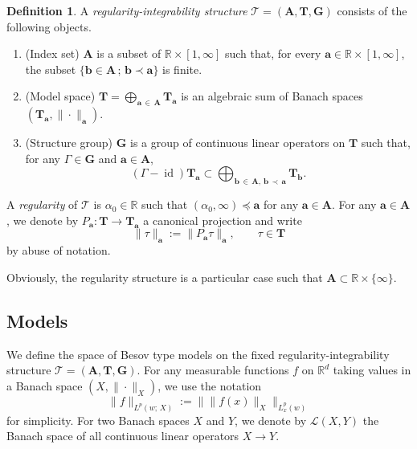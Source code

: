 \documentclass[10pt]{amsart}
\theoremstyle{definition}
\newtheorem{defi}[theo]{Definition}
\numberwithin{equation}{section}
\newcommand{\bbR}{\mathbb{R}}
\newcommand{\bfa}{\mathbf{a}}
\newcommand{\bfb}{\mathbf{b}}
\newcommand{\bfA}{\mathbf{A}}
\newcommand{\bfT}{\mathbf{T}}
\newcommand{\bfG}{\mathbf{G}}
\newcommand{\mcL}{\mathcal{L}}
\newcommand{\scT}{\mathscr{T}}
\DeclareMathOperator{\id}{id}
\begin{document}
\begin{defi}
A \emph{regularity-integrability structure} $\scT=(\bfA,\bfT,\bfG)$ consists of the following objects.
\begin{enumerate}
\item (Index set) $\bfA$ is a subset of $\bbR\times[1,\infty]$ such that, for every $\bfa\in\bbR\times[1,\infty]$, the subset $\{\bfb\in \bfA\, ;\, \bfb\prec\bfa\}$ is finite.
\item (Model space) $\bfT=\bigoplus_{{\bfa}\,\in\,\bfA}\bfT_{\bfa}$ is an algebraic sum of Banach spaces $(\bfT_{\bfa},\|\cdot\|_{\bfa})$.
\item (Structure group) $\bfG$ is a group of continuous linear operators on $\bfT$ such that, for any $\Gamma\in \bfG$ and $\bfa\in\bfA$,
\[
(\Gamma-\id)\bfT_{\bfa}\subset\bigoplus_{{\bfb}\,\in \,\bfA,\, {\bfb}\,\prec \,{\bfa}}\bfT_{\bfb}.
\]
\end{enumerate}
A \emph{regularity} of $\scT$ is $\alpha_0\in\bbR$ such that $(\alpha_0,\infty)\preceq\bfa$ for any $\bfa\in \bfA$. For any $\bfa\in\bfA$, we denote by $P_{\bfa}:\bfT\to\bfT_{\bfa}$ a canonical projection and write
\[
\|\tau\|_{\bfa}:=\|P_{\bfa}\tau\|_{\bfa},\qquad\tau\in \bfT
\]
by abuse of notation.
\end{defi}

Obviously, the regularity structure is a particular case such that $\bfA\subset\bbR\times\{\infty\}$.

\subsection{Models}

We define the space of Besov type models on the fixed regularity-integrability structure $\scT=(\bfA,\bfT,\bfG)$. For any measurable functions $f$ on $\bbR^d$ taking values in a Banach space $(X,\|\cdot\|_X)$, we use the notation
\[
\|f\|_{L^p(w;\,X)}:=\big\|\|f(x)\|_X\big\|_{L_x^p(w)}
\]
for simplicity. For two Banach spaces $X$ and $Y$, we denote by $\mcL(X,Y)$ the Banach space of all continuous linear operators $X\to Y$.
\end{document}
